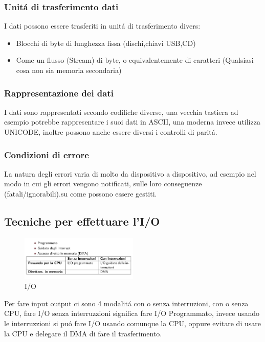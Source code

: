 \subsubsection*{Unitá di trasferimento dati}
I dati possono essere trasferiti in unitá di trasferimento divers:
\begin{itemize}
    \item Blocchi di byte di lunghezza fissa (dischi,chiavi USB,CD)
    \item Come un flusso (Stream) di byte, o equivalentemente di caratteri (Qualsiasi cosa non sia memoria secondaria)
\end{itemize}
\subsubsection*{Rappresentazione dei dati}
I dati sono rappresentati secondo codifiche diverse, una vecchia tastiera ad esempio potrebbe rappresentare i suoi dati
in ASCII, una moderna invece utilizza UNICODE, inoltre possono anche essere diversi i controlli di paritá.
\subsubsection*{Condizioni di errore}
La natura degli errori varia di molto da dispositivo a dispositivo, ad esempio nel modo in cui gli errori vengono notificati,
sulle loro conseguenze (fatali/ignorabili).su come possono essere gestiti.
\subsection{Tecniche per effettuare l'I/O}
\begin{figure}[H]
    \centering
    \includegraphics[width=0.5\textwidth]{immagini/TecnicheI_O}
    \caption{I/O}
\end{figure}
Per fare input output ci sono 4 modalitá con o senza interruzioni, con o senza CPU, fare I/O senza interruzzioni significa
fare I/O Programmato, invece usando le interruzzioni si puó fare I/O usando comunque la CPU, oppure evitare di usare la CPU e delegare
il DMA di fare il trasferimento.
